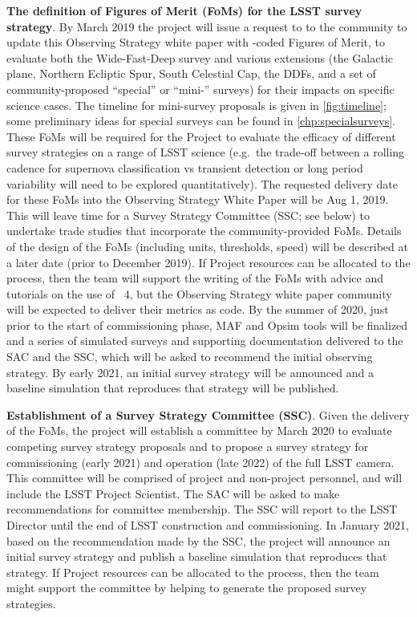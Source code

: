 \begin{description}
\item \textbf{The definition of Figures of Merit (FoMs) for the LSST
survey strategy}. By March 2019 the project will issue a request to
to the community to update this Observing Strategy white paper with
\MAF-coded Figures of Merit, to evaluate both the Wide-Fast-Deep survey and various extensions
(\eg the Galactic plane, Northern Ecliptic Spur, South Celestial
Cap, the DDFs, and a set of community-proposed ``special'' or ``mini-'' surveys) for their impacts on specific science cases. The timeline for mini-survey proposals is given in \autoref{fig:timeline}; some preliminary ideas for special surveys can be found in \autoref{chp:specialsurveys}. These FoMs will be
required for the Project to evaluate the efficacy of different survey
strategies on a range of LSST science (e.g.\ the trade-off between a
rolling cadence for supernova classification vs transient detection or
long period variability will need to be explored quantitatively). The
requested delivery date for these \MAF FoMs into the Observing Strategy
White Paper will be Aug 1, 2019. This will leave time for a Survey
Strategy Committee (SSC; see below) to undertake trade studies that
incorporate the community-provided FoMs. Details of the design of the
FoMs (including units, thresholds, speed) will be described at a later
date (prior to December 2019). If Project resources can be allocated to
the process, then the \OpSim team will support the writing
of the FoMs with advice and tutorials on the use of \OpSim~4, but
the Observing Strategy white paper community will be expected to deliver
their metrics as \MAF code.  By the summer of  2020, just prior to the
start of commissioning phase, MAF and Opsim tools will be finalized and a
series of simulated surveys and supporting documentation delivered
to the SAC and the SSC, which will be asked to recommend the initial
observing strategy. By early 2021, an initial survey strategy will be
announced and a baseline simulation that reproduces that strategy will
be published.

\item \textbf{Establishment of a Survey Strategy Committee (SSC)}. Given
the delivery of the FoMs, the project will establish a committee by March
2020 to evaluate competing survey strategy proposals and to propose a
survey strategy for commissioning (early 2021) and operation (late 2022) of the full LSST camera.
This committee will be comprised of project and non-project personnel, and
will include the LSST Project Scientist. The SAC will be asked to
make recommendations for committee membership. The SSC will report to
the LSST Director until the end of LSST construction and commissioning.
In January 2021, based on the recommendation made by the SSC, the
project will announce an initial survey strategy and publish a baseline
simulation that reproduces that strategy. If Project resources can be
allocated to the process, then the \OpSim team might support
the committee by helping to generate the proposed survey strategies.

\end{description}

